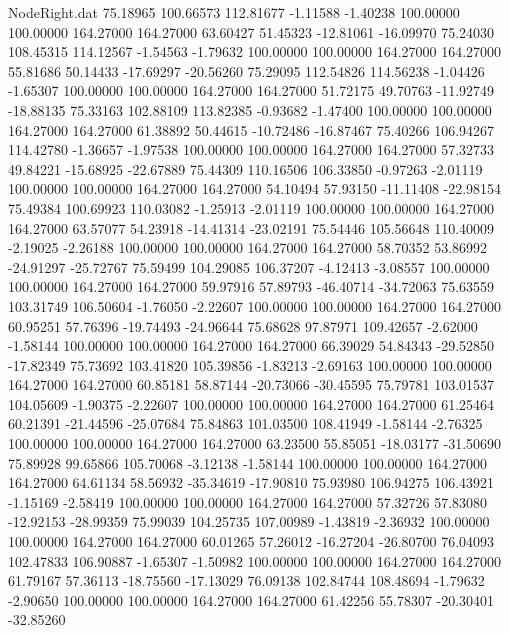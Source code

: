 \begin{filecontents}{NodeRight.dat}
  75.18965  100.66573  112.81677    -1.11588   -1.40238  100.00000  100.00000  164.27000  164.27000   63.60427   51.45323  -12.81061  -16.09970
  75.24030  108.45315  114.12567    -1.54563   -1.79632  100.00000  100.00000  164.27000  164.27000   55.81686   50.14433  -17.69297  -20.56260
  75.29095  112.54826  114.56238    -1.04426   -1.65307  100.00000  100.00000  164.27000  164.27000   51.72175   49.70763  -11.92749  -18.88135
  75.33163  102.88109  113.82385    -0.93682   -1.47400  100.00000  100.00000  164.27000  164.27000   61.38892   50.44615  -10.72486  -16.87467
  75.40266  106.94267  114.42780    -1.36657   -1.97538  100.00000  100.00000  164.27000  164.27000   57.32733   49.84221  -15.68925  -22.67889
  75.44309  110.16506  106.33850    -0.97263   -2.01119  100.00000  100.00000  164.27000  164.27000   54.10494   57.93150  -11.11408  -22.98154
  75.49384  100.69923  110.03082    -1.25913   -2.01119  100.00000  100.00000  164.27000  164.27000   63.57077   54.23918  -14.41314  -23.02191
  75.54446  105.56648  110.40009    -2.19025   -2.26188  100.00000  100.00000  164.27000  164.27000   58.70352   53.86992  -24.91297  -25.72767
  75.59499  104.29085  106.37207    -4.12413   -3.08557  100.00000  100.00000  164.27000  164.27000   59.97916   57.89793  -46.40714  -34.72063
  75.63559  103.31749  106.50604    -1.76050   -2.22607  100.00000  100.00000  164.27000  164.27000   60.95251   57.76396  -19.74493  -24.96644
  75.68628   97.87971  109.42657    -2.62000   -1.58144  100.00000  100.00000  164.27000  164.27000   66.39029   54.84343  -29.52850  -17.82349
  75.73692  103.41820  105.39856    -1.83213   -2.69163  100.00000  100.00000  164.27000  164.27000   60.85181   58.87144  -20.73066  -30.45595
  75.79781  103.01537  104.05609    -1.90375   -2.22607  100.00000  100.00000  164.27000  164.27000   61.25464   60.21391  -21.44596  -25.07684
  75.84863  101.03500  108.41949    -1.58144   -2.76325  100.00000  100.00000  164.27000  164.27000   63.23500   55.85051  -18.03177  -31.50690
  75.89928   99.65866  105.70068    -3.12138   -1.58144  100.00000  100.00000  164.27000  164.27000   64.61134   58.56932  -35.34619  -17.90810
  75.93980  106.94275  106.43921    -1.15169   -2.58419  100.00000  100.00000  164.27000  164.27000   57.32726   57.83080  -12.92153  -28.99359
  75.99039  104.25735  107.00989    -1.43819   -2.36932  100.00000  100.00000  164.27000  164.27000   60.01265   57.26012  -16.27204  -26.80700
  76.04093  102.47833  106.90887    -1.65307   -1.50982  100.00000  100.00000  164.27000  164.27000   61.79167   57.36113  -18.75560  -17.13029
  76.09138  102.84744  108.48694    -1.79632   -2.90650  100.00000  100.00000  164.27000  164.27000   61.42256   55.78307  -20.30401  -32.85260

\end{filecontents}
